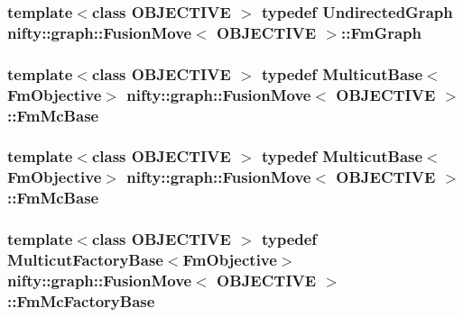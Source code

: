 \subsubsection[{Fm\+Graph}]{\setlength{\rightskip}{0pt plus 5cm}template$<$class O\+B\+J\+E\+C\+T\+I\+V\+E $>$ typedef {\bf Undirected\+Graph} {\bf nifty\+::graph\+::\+Fusion\+Move}$<$ O\+B\+J\+E\+C\+T\+I\+V\+E $>$\+::{\bf Fm\+Graph}}\label{classnifty_1_1graph_1_1FusionMove_a9192ebd1542c7525e8b3f7416ec92f63}
\hypertarget{classnifty_1_1graph_1_1FusionMove_a2805f5230219c8c6118663ca5ec9d144}{}
\subsubsection[{Fm\+Mc\+Base}]{\setlength{\rightskip}{0pt plus 5cm}template$<$class O\+B\+J\+E\+C\+T\+I\+V\+E $>$ typedef {\bf Multicut\+Base}$<${\bf Fm\+Objective}$>$ {\bf nifty\+::graph\+::\+Fusion\+Move}$<$ O\+B\+J\+E\+C\+T\+I\+V\+E $>$\+::{\bf Fm\+Mc\+Base}}\label{classnifty_1_1graph_1_1FusionMove_a2805f5230219c8c6118663ca5ec9d144}
\hypertarget{classnifty_1_1graph_1_1FusionMove_a2805f5230219c8c6118663ca5ec9d144}{}
\subsubsection[{Fm\+Mc\+Base}]{\setlength{\rightskip}{0pt plus 5cm}template$<$class O\+B\+J\+E\+C\+T\+I\+V\+E $>$ typedef {\bf Multicut\+Base}$<${\bf Fm\+Objective}$>$ {\bf nifty\+::graph\+::\+Fusion\+Move}$<$ O\+B\+J\+E\+C\+T\+I\+V\+E $>$\+::{\bf Fm\+Mc\+Base}}\label{classnifty_1_1graph_1_1FusionMove_a2805f5230219c8c6118663ca5ec9d144}
\hypertarget{classnifty_1_1graph_1_1FusionMove_a75c5190f6b01321efa3f23cb10b2dd36}{}
\subsubsection[{Fm\+Mc\+Factory\+Base}]{\setlength{\rightskip}{0pt plus 5cm}template$<$class O\+B\+J\+E\+C\+T\+I\+V\+E $>$ typedef {\bf Multicut\+Factory\+Base}$<${\bf Fm\+Objective}$>$ {\bf nifty\+::graph\+::\+Fusion\+Move}$<$ O\+B\+J\+E\+C\+T\+I\+V\+E $>$\+::{\bf Fm\+Mc\+Factory\+Base}}\label{classnifty_1_1graph_1_1FusionMove_a75c5190f6b01321efa3f23cb10b2dd36}
\hypertarget{classnifty_1_1graph_1_1FusionMove_a75c5190f6b01321efa3f23cb10b2dd36}{}
